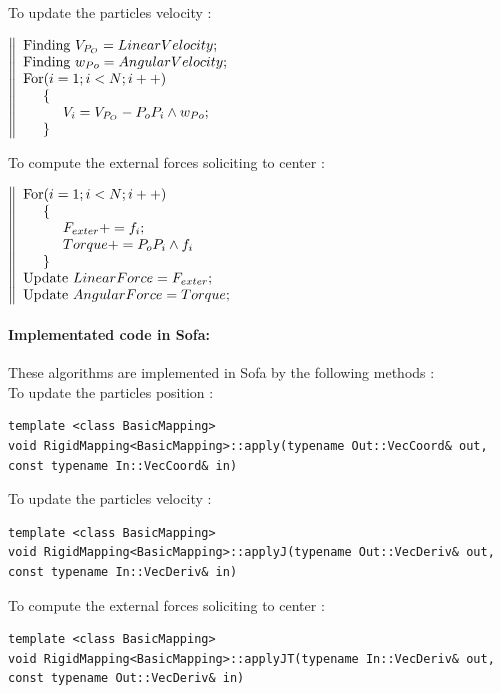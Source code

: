 \documentclass[a4paper,10pt]{article}
\begin{document}
\begin{center}To update the particles velocity : \end{center}
$
\left\|
  \begin{array}{lll}
  \text{Finding  } V_{P_O}=LinearVelocity; \\
  \text{Finding  } w_{Po}=AngularVelocity; \\
  \text{For} (i=1;i<N;i++) \\
    \hspace{0.5cm} \{ \\
    \hspace{1cm} V_i= V_{P_O} - P_oP_i \wedge w_{Po} ;\\
    \hspace{0.5cm} \} 
  \end{array}
\right.
$
\begin{center}To compute the external forces soliciting to center :  \end{center}    
$
\left\|
  \begin{array}{lll}
  \text{For} (i=1;i<N;i++) \\
    \hspace{0.5cm} \{ \\
    \hspace{1cm} F_{exter}+=f_i;\\
    \hspace{1cm} Torque+=P_oP_i  \wedge  f_i\\
    \hspace{0.5cm} \} \\
  \text{Update } LinearForce=F_{exter}; \\
  \text{Update } AngularForce=Torque; 
  \end{array}
\right.
$
\paragraph{Implementated code in Sofa: }These algorithms are implemented in Sofa by the following methods : \\
To update the particles position :
\begin{lstlisting}
template <class BasicMapping>
void RigidMapping<BasicMapping>::apply(typename Out::VecCoord& out, const typename In::VecCoord& in)
\end{lstlisting}
To update the particles velocity :
\begin{lstlisting}
template <class BasicMapping>
void RigidMapping<BasicMapping>::applyJ(typename Out::VecDeriv& out, const typename In::VecDeriv& in)
\end{lstlisting}
To compute the external forces soliciting to center :
\begin{lstlisting}
template <class BasicMapping>
void RigidMapping<BasicMapping>::applyJT(typename In::VecDeriv& out, const typename Out::VecDeriv& in)
\end{lstlisting}
\end{document}
